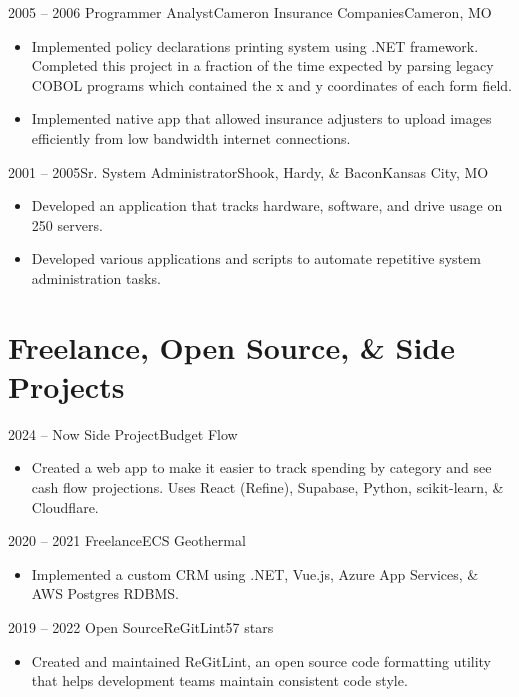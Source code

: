 \documentclass[11pt,letterpaper,final]{moderncv}
\begin{document}
	\cventry
{2005 -- 2006} {Programmer Analyst}{Cameron Insurance Companies}{Cameron, MO}{}{
		\begin{itemize}
			\item
				Implemented policy declarations printing system using .NET framework.
				Completed this project in a fraction of the time expected by
				parsing legacy COBOL programs which contained the x and y
				coordinates of each form field.
			\item
				Implemented native app that allowed insurance adjusters
				to upload images efficiently from low bandwidth internet
				connections.
		\end{itemize}
}
\linebreak

	\cventry
{2001 -- 2005}{Sr. System Administrator}{Shook, Hardy, \& Bacon}{Kansas City, MO}{}{
		\begin{itemize}
			\item
				Developed an application that tracks hardware, software, and
				drive usage on 250 servers.
			\item
				Developed various applications and scripts to automate
				repetitive system administration tasks.
		\end{itemize}
}
\linebreak

\section{Freelance, Open Source, \& Side Projects} 
	\cventry
{2024 -- Now} {Side Project}{Budget Flow}{}{}{
		\begin{itemize}
			\item 
				Created a web app to make it easier to track spending by
				category and see cash flow projections. Uses React (Refine),
				Supabase, Python, scikit-learn, \& Cloudflare.
		\end{itemize}
}
\linebreak

	\cventry
{2020 -- 2021} {Freelance}{ECS Geothermal}{}{}{
		\begin{itemize}
			\item 
				Implemented a custom CRM using .NET, Vue.js, Azure App Services,
				\& AWS Postgres RDBMS.
		\end{itemize}
}
\linebreak

	\cventry
{2019 -- 2022} {Open Source}{ReGitLint}{}{57 stars}{
		\begin{itemize}
			\item 
				Created and maintained ReGitLint, an open source code formatting
				utility that helps development teams maintain consistent code
				style.
		\end{itemize}
}
\linebreak
\end{document}
